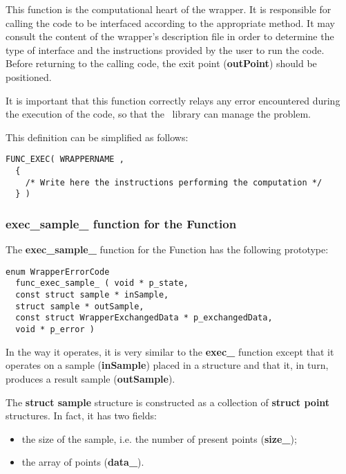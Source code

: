 This function is the computational heart of the wrapper. It is responsible for calling the code to be interfaced according to the appropriate method. It may consult the content of the wrapper's description file in order to determine the type of interface and the instructions provided by the user to run the code. Before returning to the calling code, the exit point ({\bf outPoint}) should be positioned.

It is important that this function correctly relays any error encountered during the execution of the code, so that the \OT\ library can manage the problem.

This definition can be simplified as follows:
\lstset{language=C++, basicstyle=\normalsize}
\begin{lstlisting}[frame=TBRL]
  FUNC_EXEC( WRAPPERNAME ,
  {
    /* Write here the instructions performing the computation */
  } )
\end{lstlisting}

\subsubsection {exec\_sample\_ function for the Function}

The {\bf exec\_sample\_} function for the Function has the following prototype:

\lstset{language=C++, basicstyle=\normalsize}
\begin{lstlisting}[frame=TBRL]
  enum WrapperErrorCode
  func_exec_sample_ ( void * p_state,
  const struct sample * inSample,
  struct sample * outSample,
  const struct WrapperExchangedData * p_exchangedData,
  void * p_error )
\end{lstlisting}

In the way it operates, it is very similar to the {\bf exec\_} function except that it operates on a sample ({\bf inSample}) placed in a  structure and that it, in turn, produces a result sample ({\bf outSample}).

The {\bf struct sample} structure is constructed as a collection of {\bf struct point} structures. In fact, it has two fields:
\begin{itemize}
\item the size of the sample, i.e. the number of present points ({\bf size\_});
\item the array of points ({\bf data\_}).
\end{itemize}

